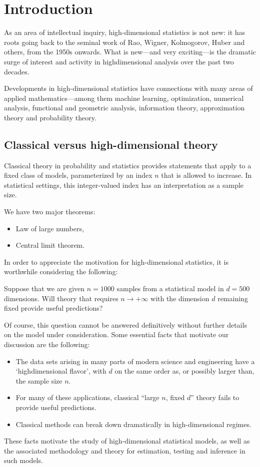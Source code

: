 \chapter{Introduction}

As an area of intellectual inquiry, high-dimensional statistics is not new: it has roots going back to the seminal work of Rao, Wigner, Kolmogorov, Huber and others, from the 1950s onwards. What is new—and very exciting—is the dramatic surge of interest and activity in highdimensional analysis over the past two decades. 

Developments in high-dimensional statistics have connections with many areas of applied mathematics—among them machine learning, optimization, numerical analysis, functional and geometric analysis, information theory, approximation theory and probability theory.

\section{Classical versus high-dimensional theory}
Classical theory in probability and statistics provides statements that apply to a fixed class of models, parameterized by an index $n$ that is allowed to increase. In statistical settings, this integer-valued index has an interpretation as a sample size. 

We have two major theorems: 
\begin{itemize}
    \item Law of large numbers,
    \item Central limit theorem.
\end{itemize}

In order to appreciate the motivation for high-dimensional statistics, it is worthwhile considering the following:


\begin{example}
\label{eg: motiv of HDS}
Suppose that we are given $n=1000$ samples from a statistical model in $d=500$ dimensions. Will theory that requires $n \rightarrow+\infty$ with the dimension $d$ remaining fixed provide useful predictions?
\end{example}

Of course, this question cannot be answered definitively without further details on the model under consideration. Some essential facts that motivate our discussion are the following:
\begin{itemize}
    \item The data sets arising in many parts of modern science and engineering have a `highdimensional flavor', with $d$ on the same order as, or possibly larger than, the sample size $n$.
    \item For many of these applications, classical ``large $n$, fixed $d$'' theory fails to provide useful predictions.
    \item Classical methods can break down dramatically in high-dimensional regimes. 
\end{itemize}
These facts motivate the study of high-dimensional statistical models, as well as the associated methodology and theory for estimation, testing and inference in such models.

